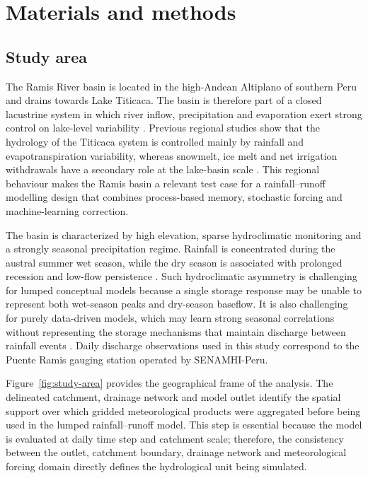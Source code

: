 \documentclass[a4paper,fleqn]{cas-sc}
\begin{document}
\section{Materials and methods}\label{sec:methods}


\subsection{Study area}\label{subsec:study-area}

The Ramis River basin is located in the high-Andean Altiplano of
southern Peru and drains towards Lake Titicaca. The basin is therefore
part of a closed lacustrine system in which river inflow, precipitation
and evaporation exert strong control on lake-level variability
\citep{cross2001late,condom2004transient,lima2025modeling}. Previous
regional studies show that the hydrology of the Titicaca system is
controlled mainly by rainfall and evapotranspiration variability,
whereas snowmelt, ice melt and net irrigation withdrawals have a
secondary role at the lake-basin scale \citep{lima2025modeling}. This
regional behaviour makes the Ramis basin a relevant test case for a
rainfall--runoff modelling design that combines process-based memory,
stochastic forcing and machine-learning correction.

The basin is characterized by high elevation, sparse hydroclimatic
monitoring and a strongly seasonal precipitation regime. Rainfall is
concentrated during the austral summer wet season, while the dry season
is associated with prolonged recession and low-flow persistence
\citep{condom2004transient,nauditt2017conceptual,lima2025modeling}.
Such hydroclimatic asymmetry is challenging for lumped conceptual
models because a single storage response may be unable to represent both
wet-season peaks and dry-season baseflow. It is also challenging for
purely data-driven models, which may learn strong seasonal correlations
without representing the storage mechanisms that maintain discharge
between rainfall events \citep{van2013influence,lees2021benchmarking}.
Daily discharge observations used in this study correspond to the
Puente Ramis gauging station operated by SENAMHI-Peru.

Figure~\ref{fig:study-area} provides the geographical frame of the
analysis. The delineated catchment, drainage network and model outlet
identify the spatial support over which gridded meteorological products
were aggregated before being used in the lumped rainfall--runoff model.
This step is essential because the model is evaluated at daily time step
and catchment scale; therefore, the consistency between the outlet,
catchment boundary, drainage network and meteorological forcing domain
directly defines the hydrological unit being simulated.
\end{document}
